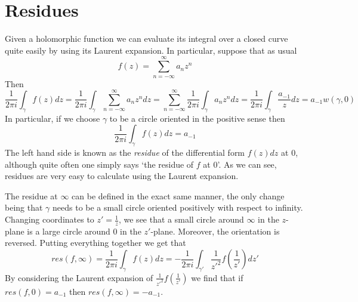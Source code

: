 \section{Residues}
Given a holomorphic function we can evaluate its integral over a closed curve quite easily by using its Laurent expansion. In particular, suppose that as usual
$$ f(z) = \sum_{n=-\infty}^\infty a_n z^n $$
Then
$$ \frac{1}{2\pi i} \int_\gamma f(z) dz = \frac{1}{2\pi i} \int_\gamma \sum_{n=-\infty}^\infty a_n z^n dz = \sum_{n=-\infty}^\infty \frac{1}{2\pi i} \int_\gamma a_n z^n dz = \frac{1}{2\pi i} \int_\gamma \frac{a_{-1}}{z} dz = a_{-1} w(\gamma, 0) $$
In particular, if we choose $\gamma$ to be a circle oriented in the positive sense then
$$ \frac{1}{2\pi i} \int_\gamma f(z) dz = a_{-1}$$
The left hand side is known as the \textit{residue} of the differential form $f(z) dz$ at 0, although quite often one simply says `the residue of $f$ at 0'. As we can see, residues are very easy to calculate using the Laurent expansion. 

The residue at $\infty$ can be defined in the exact same manner, the only change being that $\gamma$ needs to be a small circle oriented positively with respect to infinity. Changing coordinates to $z' = \frac{1}{z}$, we see that a small circle around $\infty$ in the $z$-plane is a large circle around 0 in the $z'$-plane. Moreover, the orientation is reversed. Putting everything together we get that 
$$ res(f, \infty) = \frac{1}{2\pi i} \int_\gamma f(z) dz = -\frac{1}{2\pi i} \int_{\gamma'} \frac{1}{z'^2} f \left( \frac{1}{z'} \right) dz'  $$
By considering the Laurent expansion of $\frac{1}{z'^2}f\left( \frac{1}{z'} \right)$ we find that if $res(f, 0) = a_{-1}$ then $res(f, \infty) = -a_{-1}$.
